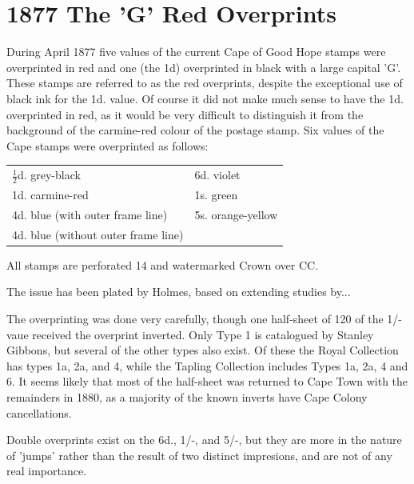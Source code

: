 \chapter{1877 The 'G' Red Overprints}    

During April 1877 five values of the current Cape of Good Hope stamps were  overprinted in red and one (the 1d) overprinted in black with a large capital 'G'. These stamps are referred to as the red overprints, despite the exceptional use of black ink for the 1d. value. Of course it did not make much sense to have the 1d. overprinted in red, as it would be very difficult to distinguish it from the background of the carmine-red colour of the postage stamp. Six values of the Cape stamps were overprinted as follows:

\begin{tabular}{ll}$\frac{1}{2}$d. grey-black & 6d. violet\\
1d. carmine-red & 1s. green\\
4d. blue (with outer frame line) &5s. orange-yellow\\
4d. blue (without outer frame line)\\
\end{tabular}

All stamps are perforated 14 and watermarked Crown over CC.

The issue has been plated by Holmes, based on extending studies by...


The overprinting was done very carefully, though one half-sheet of 120 of the 1/- vaue received the overprint inverted. Only Type 1 is catalogued by Stanley Gibbons, but several of the other types also exist. Of these the Royal Collection has types 1a, 2a, and 4, while the Tapling Collection includes Types 1a, 2a, 4 and 6. It seems likely that most of the half-sheet was returned to Cape Town with the remainders in 1880, as a majority of the known inverts have Cape Colony cancellations.

Double overprints exist on the 6d., 1/-, and 5/-, but they are more in the nature of
'jumps' rather than the result of two distinct impresions, and are not of any real importance.


